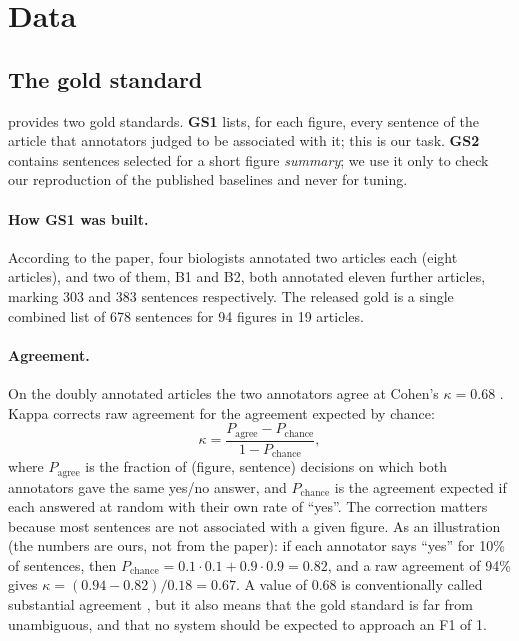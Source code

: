 \section{Data}
\label{sec:data}

\subsection{The \figsum{} gold standard}
\figsum{} \citep{ramesh2015figsum} provides two gold standards. \textbf{GS1} lists, for each figure, every
sentence of the article that annotators judged to be associated with it; this is our task. \textbf{GS2}
contains sentences selected for a short figure \emph{summary}; we use it only to check our reproduction of the
published baselines and never for tuning.

\paragraph{How GS1 was built.} According to the paper, four biologists annotated two articles each (eight
articles), and two of them, B1 and B2, both annotated eleven further articles, marking 303 and 383 sentences
respectively. The released gold is a single combined list of 678 sentences for 94 figures in 19 articles.

\paragraph{Agreement.} On the doubly annotated articles the two annotators agree at Cohen's $\kappa=0.68$
\citep{ramesh2015figsum}. Kappa \citep{cohen1960kappa} corrects raw agreement for the agreement expected by chance:
\[
\kappa=\frac{P_{\text{agree}}-P_{\text{chance}}}{1-P_{\text{chance}}},
\]
where $P_{\text{agree}}$ is the fraction of (figure, sentence) decisions on which both annotators gave the same
yes/no answer, and $P_{\text{chance}}$ is the agreement expected if each answered at random with their own
rate of ``yes''. The correction matters because most sentences are not associated with a given figure. As an
illustration (the numbers are ours, not from the paper): if each annotator says ``yes'' for 10\% of sentences,
then $P_{\text{chance}}=0.1\cdot0.1+0.9\cdot0.9=0.82$, and a raw agreement of 94\% gives
$\kappa=(0.94-0.82)/0.18=0.67$. A value of 0.68 is conventionally called substantial agreement
\citep{landis1977}, but it also means that the gold standard is far from unambiguous, and that no system
should be expected to approach an F1 of 1.

